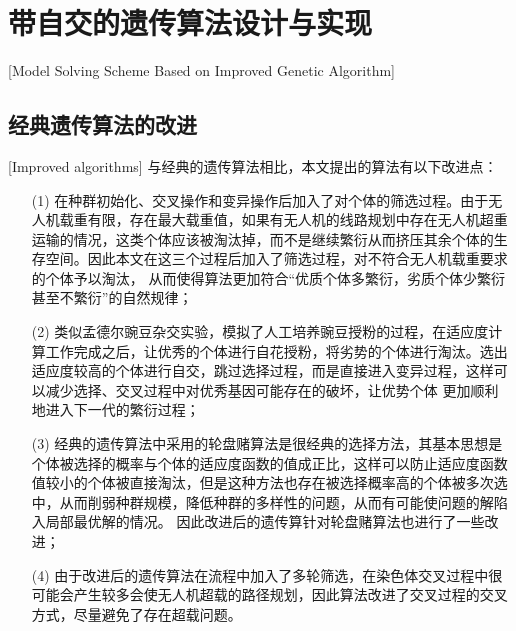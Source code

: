 
\chapter{带自交的遗传算法设计与实现}[Model Solving Scheme Based on Improved Genetic Algorithm]

\section{经典遗传算法的改进}[Improved algorithms]
与经典的遗传算法相比，本文提出的算法有以下改进点：
\begin{itemize}
	\item [(1)] 在种群初始化、交叉操作和变异操作后加入了对个体的筛选过程。由于无人机载重有限，存在最大载重值，如果有无人机的线路规划中存在无人机超重运输的情况，这类个体应该被淘汰掉，而不是继续繁衍从而挤压其余个体的生存空间。因此本文在这三个过程后加入了筛选过程，对不符合无人机载重要求的个体予以淘汰，
从而使得算法更加符合“优质个体多繁衍，劣质个体少繁衍甚至不繁衍”的自然规律；
	\item [(2)] 类似孟德尔豌豆杂交实验，模拟了人工培养豌豆授粉的过程，在适应度计算工作完成之后，让优秀的个体进行自花授粉，将劣势的个体进行淘汰。选出适应度较高的个体进行自交，跳过选择过程，而是直接进入变异过程，这样可以减少选择、交叉过程中对优秀基因可能存在的破坏，让优势个体
更加顺利地进入下一代的繁衍过程；
	\item [(3)] 经典的遗传算法中采用的轮盘赌算法是很经典的选择方法，其基本思想是个体被选择的概率与个体的适应度函数的值成正比，这样可以防止适应度函数值较小的个体被直接淘汰，但是这种方法也存在被选择概率高的个体被多次选中，从而削弱种群规模，降低种群的多样性的问题，从而有可能使问题的解陷入局部最优解的情况。
因此改进后的遗传算针对轮盘赌算法也进行了一些改进；
	\item [(4)] 由于改进后的遗传算法在流程中加入了多轮筛选，在染色体交叉过程中很可能会产生较多会使无人机超载的路径规划，因此算法改进了交叉过程的交叉方式，尽量避免了存在超载问题。
\end{itemize}


